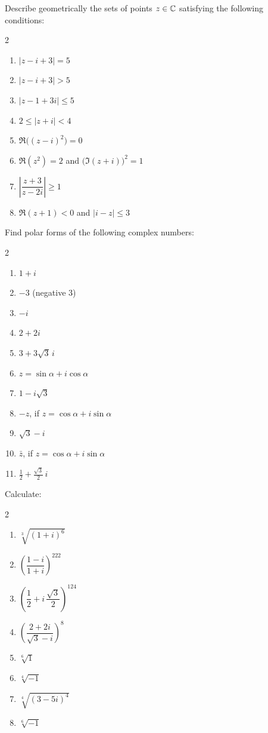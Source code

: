 \begin{exercise}
Describe geometrically the sets of points $z\in\mathbb{C}$ satisfying the following conditions:
\begin{multicols}{2}
\begin{enumerate}[label=\alph*)]
\item $|z-i+3| = 5$
\item $|z-i+3| > 5$
\item $|z-1+3i| \leq 5$
\item $2\leq |z+i| < 4$
\item $\Re\big((z-i)^2\big) = 0$
\item $\Re(z^2) = 2$ and $\big(\Im(z+i)\big)^2 = 1$
\item $\left|\dfrac{z+3}{z-2i}\right| \geq 1$
\item $\Re(z+1)<0$ and $|i-z|\leq 3$
\end{enumerate}
\end{multicols}
\end{exercise}

\begin{exercise}
Find polar forms of the following complex numbers:
\begin{multicols}{2}
\begin{enumerate}[label=\alph*)]
\item $1+i$
\item $-3$ (negative $3$)
\item $-i$
\item $2+2i$
\item $3+3\sqrt3\, i$
\item $z = \sin\alpha + i\cos\alpha$
\item $1 - i\sqrt3$
\item $-z$, if $z = \cos\alpha + i \sin\alpha$
\item $\sqrt3 - i$
\item $\bar z$, if $z = \cos\alpha + i \sin\alpha$
\item $\tfrac12 + \tfrac{\sqrt3}{2}\, i$
\end{enumerate}
\end{multicols}
\end{exercise}

\begin{exercise}
Calculate:
\begin{multicols}{2}
\begin{enumerate}[label=\alph*)]
\item $\sqrt[3]{(1+i)^6}$
\item $\left(\dfrac{1-i}{1+i}\right)^{222}$
\item $\left(\dfrac12 + i\,\dfrac{\sqrt3}{2}\right)^{124}$
\item $\left(\dfrac{2+2i}{\sqrt3 - i}\right)^{8}$
\item $\sqrt[6]{1}$
\item $\sqrt[4]{-1}$
\item $\sqrt[4]{(3-5i)^4}$
\item $\sqrt[6]{-1}$
\end{enumerate}
\end{multicols}
\end{exercise}

